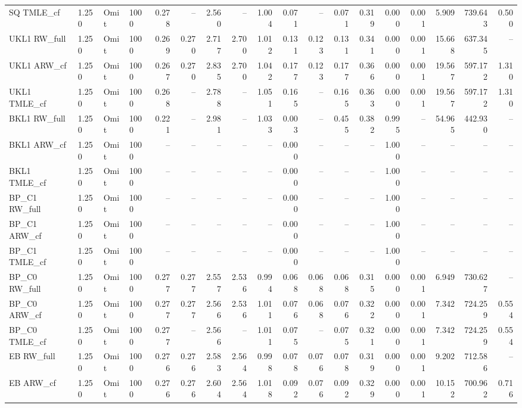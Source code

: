 \begin{tabular}{llllrrrrrrrrrrrrrr}
SQ TMLE\_cf & 1.250 & Omit & 1000 & 0.278 & -- & 2.560 & -- & 1.004 & 0.071 & -- & 0.071 & 0.319 & 0.000 & 0.001 & 5.909 & 739.643 & 0.500 \\
UKL1 RW\_full & 1.250 & Omit & 1000 & 0.269 & 0.270 & 2.717 & 2.700 & 1.012 & 0.131 & 0.123 & 0.131 & 0.341 & 0.000 & 0.001 & 15.668 & 637.345 & -- \\
UKL1 ARW\_cf & 1.250 & Omit & 1000 & 0.267 & 0.270 & 2.835 & 2.700 & 1.042 & 0.177 & 0.123 & 0.177 & 0.366 & 0.000 & 0.001 & 19.567 & 597.172 & 1.310 \\
UKL1 TMLE\_cf & 1.250 & Omit & 1000 & 0.268 & -- & 2.788 & -- & 1.051 & 0.165 & -- & 0.165 & 0.363 & 0.000 & 0.001 & 19.567 & 597.172 & 1.310 \\
BKL1 RW\_full & 1.250 & Omit & 1000 & 0.221 & -- & 2.981 & -- & 1.033 & 0.003 & -- & 0.455 & 0.382 & 0.995 & -- & 54.965 & 442.930 & -- \\
BKL1 ARW\_cf & 1.250 & Omit & 1000 & -- & -- & -- & -- & -- & 0.000 & -- & -- & -- & 1.000 & -- & -- & -- & -- \\
BKL1 TMLE\_cf & 1.250 & Omit & 1000 & -- & -- & -- & -- & -- & 0.000 & -- & -- & -- & 1.000 & -- & -- & -- & -- \\
BP\_C1 RW\_full & 1.250 & Omit & 1000 & -- & -- & -- & -- & -- & 0.000 & -- & -- & -- & 1.000 & -- & -- & -- & -- \\
BP\_C1 ARW\_cf & 1.250 & Omit & 1000 & -- & -- & -- & -- & -- & 0.000 & -- & -- & -- & 1.000 & -- & -- & -- & -- \\
BP\_C1 TMLE\_cf & 1.250 & Omit & 1000 & -- & -- & -- & -- & -- & 0.000 & -- & -- & -- & 1.000 & -- & -- & -- & -- \\
BP\_C0 RW\_full & 1.250 & Omit & 1000 & 0.277 & 0.277 & 2.557 & 2.536 & 0.994 & 0.068 & 0.068 & 0.068 & 0.315 & 0.000 & 0.001 & 6.949 & 730.627 & -- \\
BP\_C0 ARW\_cf & 1.250 & Omit & 1000 & 0.277 & 0.277 & 2.566 & 2.536 & 1.011 & 0.076 & 0.068 & 0.076 & 0.322 & 0.000 & 0.001 & 7.342 & 724.259 & 0.554 \\
BP\_C0 TMLE\_cf & 1.250 & Omit & 1000 & 0.277 & -- & 2.566 & -- & 1.011 & 0.075 & -- & 0.075 & 0.321 & 0.000 & 0.001 & 7.342 & 724.259 & 0.554 \\
EB RW\_full & 1.250 & Omit & 1000 & 0.276 & 0.276 & 2.583 & 2.564 & 0.998 & 0.078 & 0.076 & 0.078 & 0.319 & 0.000 & 0.001 & 9.202 & 712.586 & -- \\
EB ARW\_cf & 1.250 & Omit & 1000 & 0.276 & 0.276 & 2.604 & 2.564 & 1.018 & 0.092 & 0.076 & 0.092 & 0.329 & 0.000 & 0.001 & 10.152 & 700.962 & 0.716 \\

\end{tabular}
